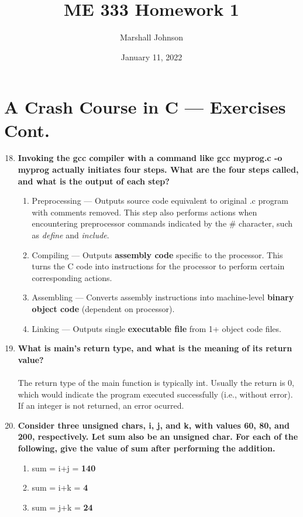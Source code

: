 \documentclass{article}
\title{ME 333 Homework 1}
\author{Marshall Johnson}
\date{January 11, 2022}
\begin{document}
\maketitle

\section*{A Crash Course in C --- Exercises Cont.}

\begin{enumerate}[label=\textbf{\arabic*})]
    \setcounter{enumi}{17}
    \item \textbf{Invoking the gcc compiler with a command like gcc myprog.c -o myprog actually initiates four steps. What are the four steps called, and what is the output of each step?}
    \begin{enumerate}[label=\Roman*.]
        \item Preprocessing --- Outputs source code equivalent to original .c program with comments removed. This step also performs actions when encountering preprocessor commands indicated by the \# character, such as \textit{define} and \textit{include}.
        \item Compiling --- Outputs \textbf{assembly code} specific to the processor. This turns the C code into instructions for the processor to perform certain corresponding actions.
        \item Assembling --- Converts assembly instructions into machine-level \textbf{binary object code} (dependent on processor).
        \item Linking --- Outputs single \textbf{executable file} from 1+ object code files.
    \end{enumerate}
    
    \item \textbf{What is main’s return type, and what is the meaning of its return value?} \\
    \\
    The return type of the main function is typically int. Usually the return is 0, which would indicate the program executed successfully (i.e., without error). If an integer is not returned, an error ocurred.
    
    \setcounter{enumi}{20}
    \item \textbf{Consider three unsigned chars, i, j, and k, with values 60, 80, and 200, respectively. Let sum also be an unsigned char. For each of the following, give the value of sum after performing the addition.}
    \begin{enumerate}[label=\textbf{\alph*}.]
        \item sum = i+j = \textbf{140}
        \item sum = i+k = \textbf{4}
        \item sum = j+k = \textbf{24}
    \end{enumerate}
    

\end{enumerate}
\end{document}
